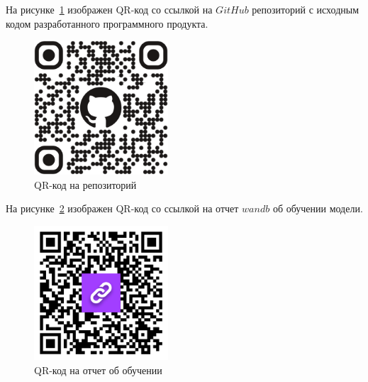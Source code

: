 
На рисунке~\ref{qr_git} изображен QR-код со ссылкой на $GitHub$ репозиторий с исходным кодом разработанного программного продукта.

\begin{figure}
    \includegraphics[width=5cm]{img/qr_git.png}
    \caption{QR-код на репозиторий}
    \label{qr_git}
\end{figure}

На рисунке~\ref{wandb_qr} изображен QR-код со ссылкой на отчет $wandb$ об обучении модели.

\begin{figure}
    \includegraphics[width=5cm]{img/qr_wandb.png}
    \caption{QR-код на отчет об обучении}
    \label{wandb_qr}
\end{figure}
